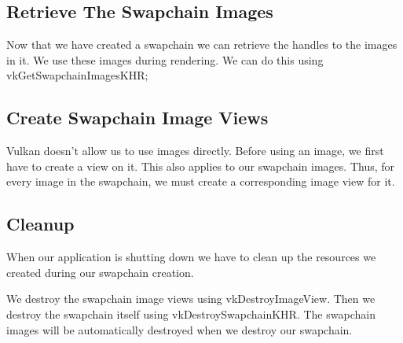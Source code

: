 \begin{minipage}{\linewidth}{\noindent}
    
\end{minipage}

\subsection{Retrieve The Swapchain Images}

Now that we have created a swapchain we can retrieve the handles to the images
in it.
We use these images during rendering.
We can do this using vkGetSwapchainImagesKHR;

\subsection{Create Swapchain Image Views}

Vulkan doesn't allow us to use images directly.
Before using an image, we first have to create a view on it.
This also applies to our swapchain images.
Thus, for every image in the swapchain, we must create a corresponding
image view for it.

\begin{minipage}{\linewidth}{\noindent}
    
\end{minipage}

\subsection{Cleanup}

When our application is shutting down we have to clean up the resources we
created during our swapchain creation.

We destroy the swapchain image views using vkDestroyImageView.
Then we destroy the swapchain itself using vkDestroySwapchainKHR.
The swapchain images will be automatically destroyed when we destroy our
swapchain.
